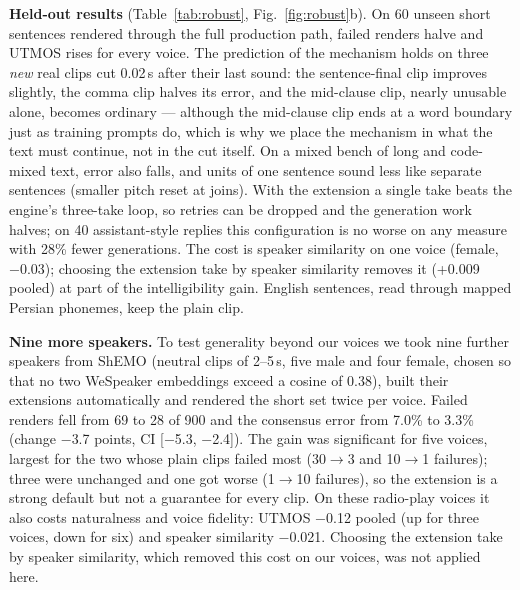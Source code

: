 \documentclass[conference]{IEEEtran}
\newcommand{\RES}[1]{#1}
\begin{document}
\textbf{Held-out results} (Table~\ref{tab:robust}, Fig.~\ref{fig:robust}b). On 60 unseen short sentences
rendered through the full production path, failed renders halve and UTMOS rises for every voice. The
prediction of the mechanism holds on three \emph{new} real clips cut 0.02\,s after their last sound: the
sentence-final clip improves slightly, the comma clip halves its error, and the mid-clause clip, nearly
unusable alone, becomes ordinary --- although the mid-clause clip ends at a word boundary just as training
prompts do, which is why we place the mechanism in what the text must continue, not in the cut itself. On a mixed bench of long and code-mixed text, error also falls, and units
of one sentence sound less like separate sentences (smaller pitch reset at joins). With the extension a single
take beats the engine's three-take loop, so retries can be dropped and the generation work halves; on 40
assistant-style replies this configuration is no worse on any measure with \RES{28\%} fewer generations.
The cost is speaker similarity on one voice (female, \RES{$-$0.03}); choosing the extension take by speaker
similarity removes it (\RES{+0.009} pooled) at part of the intelligibility gain. English sentences, read
through mapped Persian phonemes, keep the plain clip.

\textbf{Nine more speakers.} To test generality beyond our voices we took nine further speakers from ShEMO
(neutral clips of 2--5\,s, five male and four female, chosen so that no two WeSpeaker embeddings exceed a
cosine of \RES{0.38}), built their extensions automatically and rendered the short set twice per voice. Failed
renders fell from \RES{69} to \RES{28} of \RES{900} and the consensus error from \RES{7.0\%} to \RES{3.3\%}
(change \RES{$-$3.7} points, CI \RES{[$-$5.3, $-$2.4]}). The gain was significant for five voices, largest for
the two whose plain clips failed most (\RES{30$\to$3} and \RES{10$\to$1} failures); three were unchanged and one
got worse (\RES{1$\to$10} failures), so the extension is a strong default but not a guarantee for every clip.
On these radio-play voices it also costs naturalness and voice fidelity: UTMOS \RES{$-$0.12} pooled (up for
three voices, down for six) and speaker similarity \RES{$-$0.021}. Choosing the extension take by speaker
similarity, which removed this cost on our voices, was not applied here.
\end{document}
